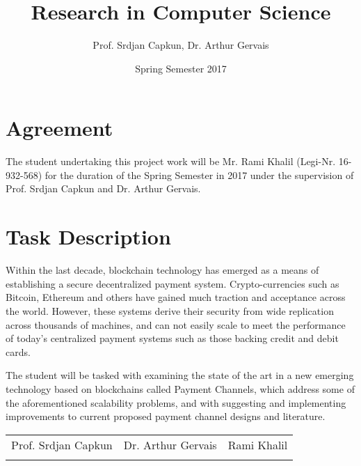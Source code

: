 \documentclass[12pt]{article}
\title{Research in Computer Science}
\date{Spring Semester 2017}
\author{Prof. Srdjan Capkun, Dr. Arthur Gervais}
\begin{document}
\maketitle

\section{Agreement}
The student undertaking this project work will be Mr. Rami Khalil (Legi-Nr. 16-932-568) for the duration of the Spring Semester in 2017 under the supervision of Prof. Srdjan Capkun and Dr. Arthur Gervais.

\section{Task Description}
Within the last decade, blockchain technology has emerged as a means of establishing a secure decentralized payment system. Crypto-currencies such as Bitcoin, Ethereum and others have gained much traction and acceptance across the world. However, these systems derive their security from wide replication across thousands of machines, and can not easily scale to meet the performance of today's centralized payment systems such as those backing credit and debit cards.

The student will be tasked with examining the state of the art in a new emerging technology based on blockchains called Payment Channels, which address some of the aforementioned scalability problems, and with suggesting and implementing improvements to current proposed payment channel designs and literature.

\vspace{5em}

\begin{tabular}{c c c}

Prof. Srdjan Capkun & Dr. Arthur Gervais & Rami Khalil \\

\underline{\hspace{5cm}} & \underline{\hspace{5cm}} & \underline{\hspace{5cm}} \\

\end{tabular}
\end{document}

